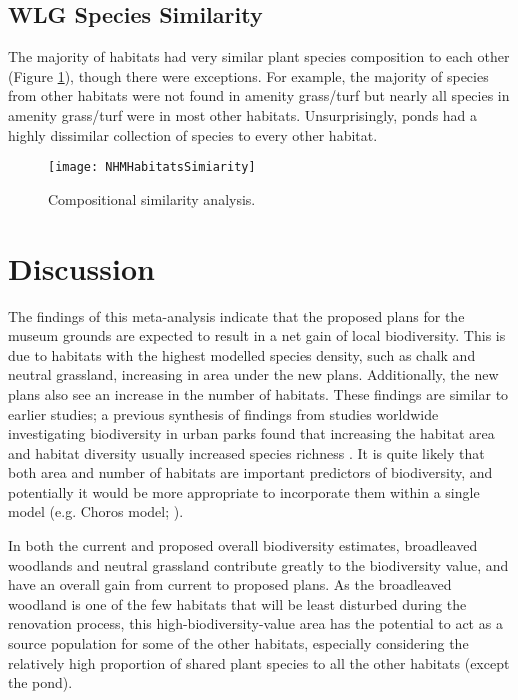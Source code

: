 \subsection{WLG Species Similarity}
The majority of habitats had very similar plant species composition to each other (Figure \ref{fig:wlgsimilarity}), though there were exceptions. For example, the majority of species from other habitats were not found in amenity grass/turf but nearly all species in amenity grass/turf were in most other habitats. Unsurprisingly, ponds had a highly dissimilar collection of species to every other habitat.


\begin{figure}[t]
	\centering
	\texttt{[image: NHMHabitatsSimiarity]}
	\caption{Compositional similarity analysis.}
   	 \label{fig:wlgsimilarity}
\end{figure}
\section{Discussion}
The findings of this meta-analysis indicate that the proposed plans for the museum grounds are expected to result in a net gain of local biodiversity. This is due to habitats with the highest modelled species density, such as chalk and neutral grassland, increasing in area under the new plans. Additionally, the new plans also see an increase in the number of habitats.  These findings are similar to earlier studies; a previous synthesis of findings from studies worldwide investigating biodiversity in urban parks found that increasing the habitat area and habitat diversity usually increased species richness \citep{Nielsen:2014ue}.  It is quite likely that both area and number of habitats are important predictors of biodiversity, and potentially it would be more appropriate to incorporate them within a single model (e.g. Choros model; \citealt{Triantis:2003jb}).

In both the current and proposed overall biodiversity estimates, broadleaved woodlands and neutral grassland contribute greatly to the biodiversity value, and have an overall gain from current to proposed plans. As the broadleaved woodland is one of the few habitats that will be least disturbed during the renovation process, this high-biodiversity-value area has the potential to act as a source population for some of the other habitats, especially considering the relatively high proportion of shared plant species to all the other habitats (except the pond).

